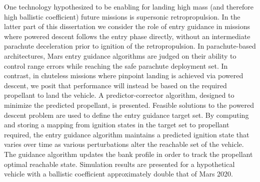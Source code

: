 {  One technology hypothesized to be enabling for landing high mass (and therefore high ballistic coefficient) future missions is supersonic retropropulsion. In the latter part of this dissertation we consider the role of entry guidance in missions where powered descent follows the entry phase directly, without an intermediate parachute deceleration prior to ignition of the retropropulsion. In parachute-based architectures, Mars entry guidance algorithms are judged on their ability to control range errors while reaching the safe parachute deployment set. In contrast, in chuteless missions where pinpoint landing is achieved via powered descent, we posit that performance will instead be based on the required propellant to land the vehicle.   
  A predictor-corrector algorithm, designed to minimize the predicted propellant, is presented. Feasible solutions to the powered descent problem are used to define the entry guidance target set. By computing and storing a mapping from ignition states in the target set to propellant required, the entry guidance algorithm maintains a predicted ignition state that varies over time as various perturbations alter the reachable set of the vehicle. The guidance algorithm updates the bank profile in order to track the propellant optimal reachable state. Simulation results are presented for a hypothetical vehicle with a ballistic coefficient approximately double that of Mars 2020. 
}


